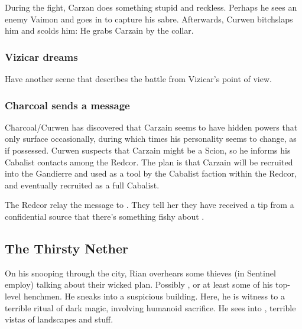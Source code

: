 \begin{garbage}
During the fight, Carzan does something stupid and reckless. 
Perhaps he sees an enemy Vaimon and goes in to capture his sabre. 
Afterwards, Curwen bitchslaps him and scolds him: 
He grabs Carzain by the collar. 





\subsubsection{Vizicar dreams}
Have another scene that describes the battle from Vizicar's point of view. 





\subsubsection{Charcoal sends a message}
Charcoal/Curwen has discovered that Carzain seems to have hidden powers that only surface occasionally, during which times his personality seems to change, as if possessed. Curwen suspects that Carzain might be a Scion, so he informs his Cabalist contacts among the Redcor. The plan is that Carzain will be recruited into the Gandierre and used as a tool by the Cabalist faction within the Redcor, and eventually recruited as a full Cabalist. 

The Redcor relay the message to \Esmerel. 
They tell her they have received a tip from a confidential source that there's something fishy about \Shireyo. 








\subsection{The Thirsty Nether}
On his snooping through the city, Rian overhears some thieves (in Sentinel employ) talking about their wicked plan. 
Possibly \Psyrex{}, or at least some of his top-level henchmen. 
He sneaks into a suspicious building. 
Here, he is witness to a terrible ritual of dark magic, involving humanoid sacrifice. 
He sees into \Machai, terrible vistas of \daemonic{} landscapes and stuff. 


\end{garbage}
